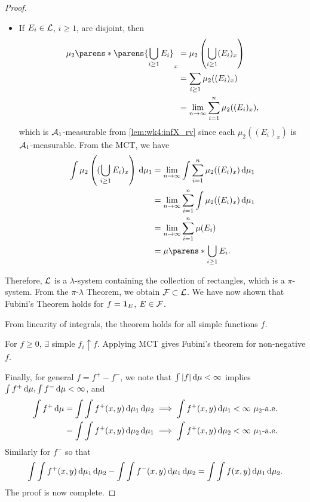 \documentclass[12pt]{article}
\begin{document}
\begin{proof}
\begin{itemize}
\item If $E_i \in \mathcal{L}$, $i\geq 1$, are disjoint, then
\begin{align*}
\mu_2\parens*{\parens{\bigcup_{i \geq 1}E_i}_x}
&=\mu_2\left(\bigcup_{i \geq 1}({E_i})_x\right) \\
& = \sum_{i \geq 1} \mu_2((E_i)_x)\\
& =\lim_{n \to \infty} \sum_{i=1}^n \mu_2((E_i)_x),
\end{align*}
which is $\mathcal{A}_1$-measurable from \cref{lem:wk4:infX_rv} since each $\mu_2((E_i)_x)$ is $\mathcal{A}_1$-measurable. From the MCT, we have
\begin{align*}
\int \mu_2\left((\bigcup_{i \geq 1}{E_i})_x\right) \ud \mu_1 
& = \lim_{n \to \infty}{\int \sum_{i = 1}^n{\mu_2 ((E_i)_x} )\ud \mu_1 }\\
& =  \lim_{n \to \infty}{\sum_{i = 1}^n{\int \mu_2 ((E_i)_x} )\ud \mu_1 }\\
& = \lim_{n \to \infty}\sum_{i=1}^n \mu (E_i)\\
& = \mu\parens*{\bigcup_{i \geq 1} {E_i}}.
\end{align*}
\end{itemize}
Therefore, $\mathcal{L}$ is a $\lambda$-system containing the collection of rectangles, which is a $\pi$-system. From the $\pi$-$\lambda$ Theorem, we obtain $\mathcal{F} \subset \mathcal{L}$. We have now shown that Fubini's Theorem holds for $f={\bf 1}_{E}$, $E \in \mathcal{F}$.

From linearity of integrals, the theorem holds for all simple functions $f$.

For $f \geq 0$, $\exists$ simple $f_i \uparrow f$. Applying MCT gives Fubini's theorem for non-negative $f$.

Finally, for general $f=f^+-f^-$, we note that $\int |f| \,\mathrm{d} \mu <\infty$ implies $\int f^+ \,\mathrm{d} \mu, \int f^- \,\mathrm{d} \mu<\infty$, and
\begin{align*}
\int f^+ \,\mathrm{d} \mu = \int \int f^+(x,y) \,\mathrm{d} \mu_1 \,\mathrm{d} \mu_2 \implies  \int f^+(x,y) \,\mathrm{d} \mu_1 <\infty\ \text{$\mu_2$-a.e.} \\
= \int \int f^+(x,y) \,\mathrm{d} \mu_2 \,\mathrm{d} \mu_1 \implies  \int f^+(x,y) \,\mathrm{d} \mu_2 <\infty\ \text{$\mu_1$-a.e.} 
\end{align*}
Similarly for $f^-$ so that
\begin{align*}
 \int \int f^+(x,y) \,\mathrm{d} \mu_1 \,\mathrm{d} \mu_2 - \int \int f^-(x,y) \,\mathrm{d} \mu_1 \,\mathrm{d} \mu_2 = \int \int f(x,y) \,\mathrm{d} \mu_1 \,\mathrm{d} \mu_2.
\end{align*}
The proof is now complete.
\end{proof}
\end{document}
